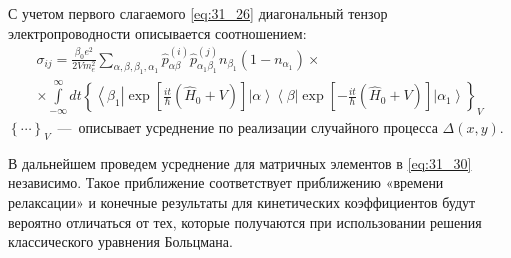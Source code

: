 С учетом первого слагаемого \eqref{eq:31_26} диагональный тензор
электропроводности описывается соотношением:
\begin{multline}\label{eq:31_30}
\displaystyle\sigma_{ij}=\frac{\beta_0 e^2}{2Vm_e^2}
\sum\limits_{\alpha,\beta ,\beta_1 ,\alpha_1 } \hat {p}_{\alpha \beta}^{(i)} \hat{p}_{\alpha_1 \beta_1}^{(j)}
n_{\beta_1} \left( 1 - n_{\alpha_1}\right)\times\\
\times\int\limits_{- \infty }^\infty {dt
	\left\{ \left\langle\beta_1 \right|
	\exp\left[\frac{it}{\hbar}\left(\hat{H}_0 + V\right)\right]
	\left|\alpha\right\rangle \right.}
\displaystyle\left.\left\langle \beta\right|\exp\left[-\frac{it}{\hbar}\left(\hat {H}_0 + V\right)\right]
\left|\alpha_1\right\rangle\right\}_V
\end{multline}
${\left\{\cdots \right\}}_V$~---~описывает усреднение по реализации случайного процесса $\Delta \left(x,y\right)$.

В дальнейшем проведем усреднение для матричных элементов в \eqref{eq:31_30} независимо. Такое приближение соответствует приближению «времени релаксации» \cite{Khamidullin2002} и конечные результаты для кинетических коэффициентов будут вероятно отличаться от тех, которые получаются при использовании решения классического уравнения Больцмана. 

